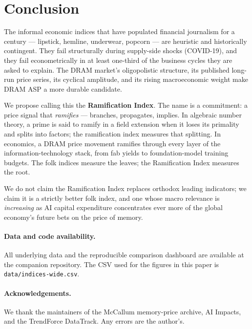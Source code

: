 \documentclass[11pt,a4paper]{article}
\begin{document}
\section{Conclusion}
\label{sec:conclusion}

The informal economic indices that have populated financial journalism for a century --- lipstick, hemline, underwear, popcorn --- are heuristic and historically contingent. They fail structurally during supply-side shocks (COVID-19), and they fail econometrically in at least one-third of the business cycles they are asked to explain. The DRAM market's oligopolistic structure, its published long-run price series, its cyclical amplitude, and its rising macroeconomic weight make DRAM ASP a more durable candidate.

We propose calling this the \textbf{Ramification Index}. The name is a commitment: a price signal that \emph{ramifies} --- branches, propagates, implies. In algebraic number theory, a prime is said to ramify in a field extension when it loses its primality and splits into factors; the ramification index measures that splitting. In economics, a DRAM price movement ramifies through every layer of the information-technology stack, from fab yields to foundation-model training budgets. The folk indices measure the leaves; the Ramification Index measures the root.

We do not claim the Ramification Index replaces orthodox leading indicators; we claim it is a strictly better folk index, and one whose macro relevance is \emph{increasing} as AI capital expenditure concentrates ever more of the global economy's future bets on the price of memory.

\paragraph{Data and code availability.} All underlying data and the reproducible comparison dashboard are available at the companion repository. The CSV used for the figures in this paper is \verb|data/indices-wide.csv|.

\paragraph{Acknowledgements.} We thank the maintainers of the McCallum memory-price archive, AI Impacts, and the TrendForce DataTrack. Any errors are the author's.



\end{document}
